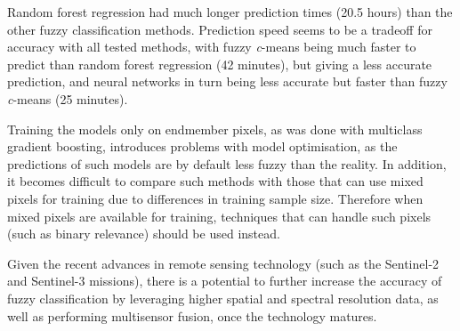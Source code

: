 \documentclass[a4paper,12pt]{scrbook}
\begin{document}
Random forest regression had much longer prediction times (20.5 hours) than the other fuzzy classification methods. Prediction speed seems to be a tradeoff for accuracy with all tested methods, with fuzzy \textit{c}-means being much faster to predict than random forest regression (42 minutes), but giving a less accurate prediction, and neural networks in turn being less accurate but faster than fuzzy \textit{c}-means (25 minutes).


Training the models only on endmember pixels, as was done with multiclass gradient boosting, introduces problems with model optimisation, as the predictions of such models are by default less fuzzy than the reality. In addition, it becomes difficult to compare such methods with those that can use mixed pixels for training due to differences in training sample size. Therefore when mixed pixels are available for training, techniques that can handle such pixels (such as binary relevance) should be used instead.

Given the recent advances in remote sensing technology (such as the Sentinel-2 and Sentinel-3 missions), there is a potential to further increase the accuracy of fuzzy classification by leveraging higher spatial and spectral resolution data, as well as performing multisensor fusion, once the technology matures.


\end{document}
